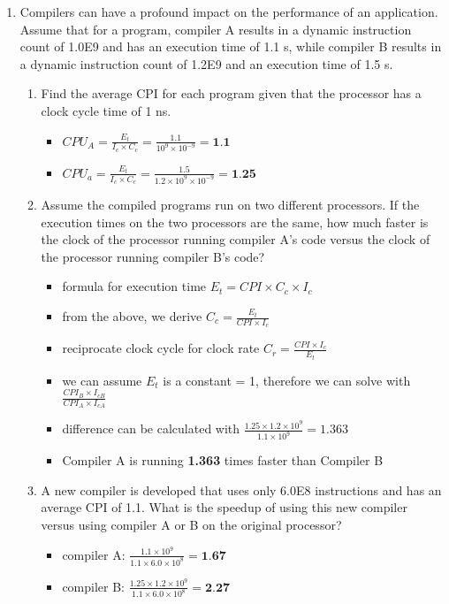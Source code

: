 \documentclass[10pt]{article}
\begin{document}
\begin{enumerate}
    \item Compilers can have a profound impact on the performance of an application. Assume that for a program, compiler A results in a dynamic instruction count of 1.0E9 and has an execution time of 1.1 s, while compiler B results in a dynamic instruction count of 1.2E9 and an execution time of 1.5 s.
    \begin{enumerate}
        \item Find the average CPI for each program given that the processor has a clock cycle time of 1 ns.
        \begin{itemize}
            \item $CPU_A = \frac{E_t}{I_c \times C_c} = \frac{1.1}{10^9 \times 10^{-9}} = \textbf{1.1}$
            \item $CPU_a = \frac{E_t}{I_c \times C_c} = \frac{1.5}{1.2\times10^9\times10^{-9}} = \textbf{1.25}$
        \end{itemize}
        \item Assume the compiled programs run on two different processors. If the execution times on the two processors are the same, how much faster is the clock of the processor running compiler A's code versus the clock of the processor running compiler B's code?
        \begin{itemize}
            \item formula for execution time $E_t = CPI \times C_c \times I_c$
            \item from the above, we derive $C_c = \frac{E_t}{CPI \times I_c}$
            \item reciprocate clock cycle for clock rate $C_r = \frac{CPI \times I_c}{E_t}$
            \item we can assume $E_t$ is a constant = 1, therefore we can solve with $\frac{CPI_B \times I_{cB}}{CPI_A \times I_{cA}}$
            \item difference can be calculated with $\frac{1.25 \times 1.2 \times 10^9}{1.1 \times 10^9} = 1.363$
            \item Compiler A is running \textbf{1.363} times faster than Compiler B
        \end{itemize}
        \item A new compiler is developed that uses only 6.0E8 instructions and has an average CPI of 1.1. What is the speedup of using this new compiler versus using compiler A or B on the original processor?
        \begin{itemize}
            \item compiler A: $\frac{1.1 \times 10^9}{1.1 \times 6.0 \times 10^8} = \textbf{1.67}$
            \item compiler B: $\frac{1.25 \times 1.2 \times 10^9}{1.1 \times 6.0 \times 10^8} = \textbf{2.27}$
        \end{itemize}
    \end{enumerate}
    

\end{enumerate}
\end{document}
